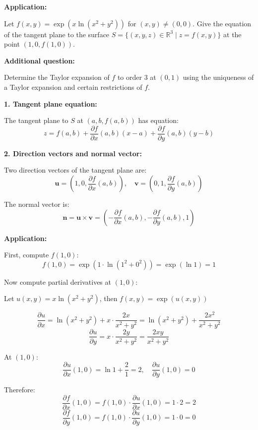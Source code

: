 \documentclass[12pt]{article}
\begin{document}
\textbf{Application:}

Let $f(x, y) = \exp(x \ln(x^2 + y^2))$ for $(x, y) \neq (0, 0)$. Give the equation of the tangent plane to the surface $S = \{(x, y, z) \in \mathbb{R}^3 \mid z = f(x, y)\}$ at the point $(1, 0, f(1, 0))$.

\vspace{0.5em}

\noindent \textbf{Additional question:}

Determine the Taylor expansion of $f$ to order 3 at $(0,1)$ using the uniqueness of a Taylor expansion and certain restrictions of $f$.

\begin{correctionbox}
\textbf{1. Tangent plane equation:}

The tangent plane to $S$ at $(a, b, f(a, b))$ has equation:
$$z = f(a, b) + \frac{\partial f}{\partial x}(a, b)(x - a) + \frac{\partial f}{\partial y}(a, b)(y - b)$$

\textbf{2. Direction vectors and normal vector:}

Two direction vectors of the tangent plane are:
$$\mathbf{u} = \left(1, 0, \frac{\partial f}{\partial x}(a, b)\right), \quad \mathbf{v} = \left(0, 1, \frac{\partial f}{\partial y}(a, b)\right)$$

The normal vector is:
$$\mathbf{n} = \mathbf{u} \times \mathbf{v} = \left(-\frac{\partial f}{\partial x}(a, b), -\frac{\partial f}{\partial y}(a, b), 1\right)$$

\textbf{Application:}

First, compute $f(1, 0)$:
$$f(1, 0) = \exp(1 \cdot \ln(1^2 + 0^2)) = \exp(\ln 1) = 1$$

Now compute partial derivatives at $(1, 0)$:

Let $u(x, y) = x \ln(x^2 + y^2)$, then $f(x, y) = \exp(u(x, y))$

$$\frac{\partial u}{\partial x} = \ln(x^2 + y^2) + x \cdot \frac{2x}{x^2 + y^2} = \ln(x^2 + y^2) + \frac{2x^2}{x^2 + y^2}$$
$$\frac{\partial u}{\partial y} = x \cdot \frac{2y}{x^2 + y^2} = \frac{2xy}{x^2 + y^2}$$

At $(1, 0)$:
$$\frac{\partial u}{\partial x}(1, 0) = \ln 1 + \frac{2}{1} = 2, \quad \frac{\partial u}{\partial y}(1, 0) = 0$$

Therefore:
$$\frac{\partial f}{\partial x}(1, 0) = f(1, 0) \cdot \frac{\partial u}{\partial x}(1, 0) = 1 \cdot 2 = 2$$
$$\frac{\partial f}{\partial y}(1, 0) = f(1, 0) \cdot \frac{\partial u}{\partial y}(1, 0) = 1 \cdot 0 = 0$$


\end{correctionbox}
\end{document}
